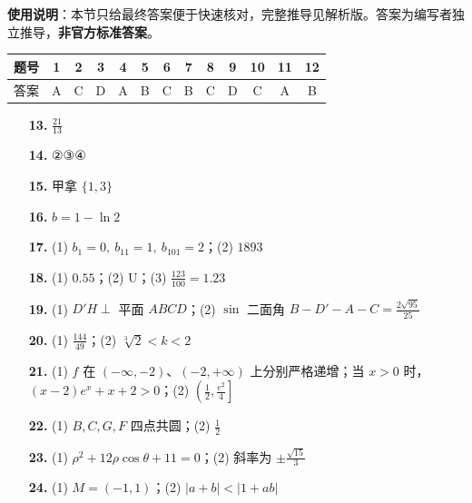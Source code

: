 
\begin{gknotice}
\textbf{使用说明}：本节只给最终答案便于快速核对，完整推导见解析版。答案为编写者独立推导，\textbf{非官方标准答案}。
\end{gknotice}

\begin{center}\begin{tabular}{ccccccccccccc}
\toprule
题号 & 1 & 2 & 3 & 4 & 5 & 6 & 7 & 8 & 9 & 10 & 11 & 12 \\
\midrule
答案 & A & C & D & A & B & C & B & C & D & C & A & B \\
\bottomrule
\end{tabular}\end{center}

\begin{itemize}[leftmargin=2.6em]
  \item[\textbf{13.}] \(\frac{21}{13}\)
  \item[\textbf{14.}] ②③④
  \item[\textbf{15.}] 甲拿 \(\{1,3\}\)
  \item[\textbf{16.}] \(b=1-\ln2\)
\end{itemize}

\begin{itemize}[leftmargin=2.6em]
  \item[\textbf{17.}] (1) \(b_1=0,\ b_{11}=1,\ b_{101}=2\)；(2) \(1893\)
  \item[\textbf{18.}] (1) \(0.55\)；(2) U；(3) \(\frac{123}{100}=1.23\)
  \item[\textbf{19.}] (1) \(D'H\perp\) 平面 \(ABCD\)；(2) \(\sin\) 二面角 \(B-D'-A-C=\frac{2\sqrt{95}}{25}\)
  \item[\textbf{20.}] (1) \(\frac{144}{49}\)；(2) \(\sqrt[3]{2}<k<2\)
  \item[\textbf{21.}] (1) \(f\) 在 \((-\infty,-2)\)、\((-2,+\infty)\) 上分别严格递增；当 \(x>0\) 时，\((x-2)e^x+x+2>0\)；(2) \(\left(\frac12,\frac{e^2}{4}\right]\)
\end{itemize}

\begin{itemize}[leftmargin=2.6em]
  \item[\textbf{22.}] (1) \(B,C,G,F\) 四点共圆；(2) \(\frac12\)
  \item[\textbf{23.}] (1) \(\rho^2+12\rho\cos\theta+11=0\)；(2) 斜率为 \(\pm\frac{\sqrt{15}}3\)
  \item[\textbf{24.}] (1) \(M=(-1,1)\)；(2) \(|a+b|<|1+ab|\)
\end{itemize}
